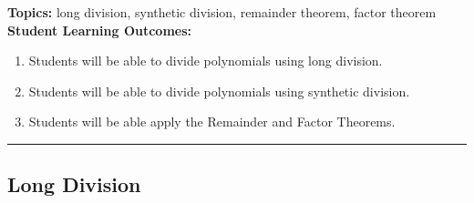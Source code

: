 
\noindent \textbf{Topics:}  long division, synthetic division, remainder theorem, factor theorem\\

\noindent \textbf{Student Learning Outcomes:}
\begin{enumerate}
\item Students will be able to divide polynomials using long division.
\item Students will be able to divide polynomials using synthetic division.
\item Students will be able apply the Remainder and Factor Theorems.

\end{enumerate}

\hrule

\bigskip

\subsection{Long Division}

